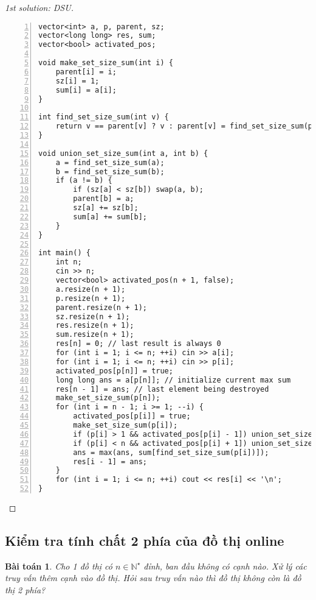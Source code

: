 \documentclass{article}
\newtheorem{baitoan}{Bài toán}
\begin{document}
\begin{proof}[1st solution: DSU]
\begin{enumerate}
\begin{Verbatim}[numbers=left,xleftmargin=5mm]
vector<int> a, p, parent, sz;
vector<long long> res, sum;
vector<bool> activated_pos;

void make_set_size_sum(int i) {
    parent[i] = i;
    sz[i] = 1;
    sum[i] = a[i];
}

int find_set_size_sum(int v) {
    return v == parent[v] ? v : parent[v] = find_set_size_sum(parent[v]);
}

void union_set_size_sum(int a, int b) {
    a = find_set_size_sum(a);
    b = find_set_size_sum(b);
    if (a != b) {
        if (sz[a] < sz[b]) swap(a, b);
        parent[b] = a;
        sz[a] += sz[b];
        sum[a] += sum[b];
    }
}

int main() {
    int n;
    cin >> n;
    vector<bool> activated_pos(n + 1, false);
    a.resize(n + 1);
    p.resize(n + 1);
    parent.resize(n + 1);
    sz.resize(n + 1);
    res.resize(n + 1);
    sum.resize(n + 1);
    res[n] = 0; // last result is always 0
    for (int i = 1; i <= n; ++i) cin >> a[i];
    for (int i = 1; i <= n; ++i) cin >> p[i];
    activated_pos[p[n]] = true;
    long long ans = a[p[n]]; // initialize current max sum
    res[n - 1] = ans; // last element being destroyed
    make_set_size_sum(p[n]);
    for (int i = n - 1; i >= 1; --i) {
        activated_pos[p[i]] = true;
        make_set_size_sum(p[i]);
        if (p[i] > 1 && activated_pos[p[i] - 1]) union_set_size_sum(p[i], p[i] - 1);
        if (p[i] < n && activated_pos[p[i] + 1]) union_set_size_sum(p[i], p[i] + 1);
        ans = max(ans, sum[find_set_size_sum(p[i])]);
        res[i - 1] = ans;
    }
    for (int i = 1; i <= n; ++i) cout << res[i] << '\n';
}
        \end{Verbatim}
    \end{enumerate}
\end{proof}


\subsection{Kiểm tra tính chất 2 phía của đồ thị online}

\begin{baitoan}
    Cho 1 đồ thị có $n\in\mathbb{N}^\star$ đỉnh, ban đầu không có cạnh nào. Xử lý các truy vấn thêm cạnh vào đồ thị. Hỏi sau truy vấn nào thì đồ thị không còn là đồ thị 2 phía?
\end{baitoan}
\end{document}
